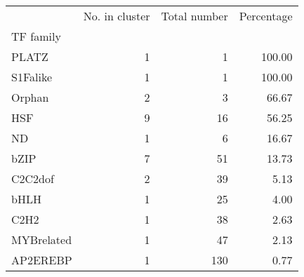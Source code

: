 \begin{tabular}{lrrr}
\toprule
{} &  No. in cluster &  Total number &  Percentage \\
TF family  &                 &               &             \\
\midrule
PLATZ      &               1 &             1 &      100.00 \\
S1Falike   &               1 &             1 &      100.00 \\
Orphan     &               2 &             3 &       66.67 \\
HSF        &               9 &            16 &       56.25 \\
ND         &               1 &             6 &       16.67 \\
bZIP       &               7 &            51 &       13.73 \\
C2C2dof    &               2 &            39 &        5.13 \\
bHLH       &               1 &            25 &        4.00 \\
C2H2       &               1 &            38 &        2.63 \\
MYBrelated &               1 &            47 &        2.13 \\
AP2EREBP   &               1 &           130 &        0.77 \\
\bottomrule
\end{tabular}
